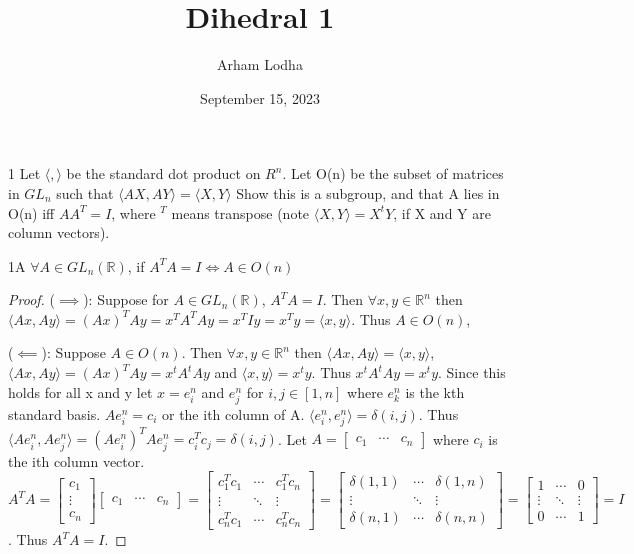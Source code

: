 \documentclass{article}
\newcommand{\R}{\mathbb{R}}
\newcommand{\angles}[1]{\langle{#1}\rangle}
\begin{document}
\title{Dihedral 1}
\author{Arham Lodha}%
\date{September 15, 2023}%
\maketitle

\begin{PROB}{1}\label{Problem 1.}
    Let $\langle, \rangle$ be the standard dot product on $R^n$. Let O(n) be the subset of matrices in $GL_n$ such that $\langle AX,AY \rangle = \langle X,Y \rangle$ Show this is a subgroup, and that A lies in O(n) iff $A A^T = I$, where $^T$ means transpose (note $\langle X,Y\rangle = X^t Y$, if X and Y are column vectors). 
\end{PROB}

\begin{claim}{1A}
    $\forall A \in GL_n(\R)$, if $A^TA = I \iff A \in O(n)$
\end{claim}
\begin{proof}
    ($\implies$): Suppose for $A \in GL_n(\R)$, $A^TA = I$. Then $\forall x, y \in \R^n$ then $\angles{Ax, Ay} = (Ax)^T Ay = x^T A^TA y = x^T I y = x^T y = \angles{x, y}$. Thus $A \in O(n)$,

    ($\impliedby$): Suppose $A \in O(n)$. Then $\forall x, y \in \R^n$ then $\angles{Ax, Ay} = \angles{x, y}$, $\angles{Ax, Ay} = (Ax)^T Ay = x^t A^t A y $ and $\angles{x, y} = x^ty$. Thus $x^t A^t A y = x^t y$. Since this holds for all x and y let $x = e^n_i$ and $e^n_j$ for $i, j \in [1, n]$ where $e^n_k$ is the kth standard basis. $Ae^n_i = c_i$ or the ith column of A. $\angles{e^n_i, e^n_j} = \delta(i, j)$. Thus $\angles{Ae_i^n, Ae_j^n} = (Ae_i^n)^T Ae_j^n = c_i^T c_j = \delta(i, j)$. Let $A = \begin{bmatrix}
        c_1 & \cdots & c_n
    \end{bmatrix}$ where $c_i$ is the ith column vector. $A^T A = \begin{bmatrix}
        c_1 \\ \vdots \\ c_n
    \end{bmatrix} \begin{bmatrix}
        c_1 & \cdots & c_n
    \end{bmatrix} = \begin{bmatrix}
        c_1^Tc_1 & \cdots & c_1^Tc_n \\
        \vdots & \ddots & \vdots \\
        c_n^T c_1 & \cdots & c_n^Tc_n
    \end{bmatrix} = \begin{bmatrix}
        \delta(1, 1) & \cdots & \delta(1, n) \\
        \vdots & \ddots & \vdots \\
        \delta(n, 1) & \cdots & \delta(n, n)
    \end{bmatrix} = \begin{bmatrix}
        1 & \cdots & 0 \\
        \vdots & \ddots & \vdots \\
        0 & \cdots & 1
    \end{bmatrix} = I$. Thus $A^TA = I$.      
\end{proof}
\end{document}
